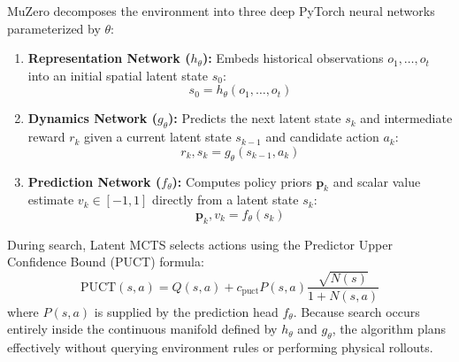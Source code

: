 \documentclass[12pt,a4paper]{article}
\begin{document}
MuZero decomposes the environment into three deep PyTorch neural networks parameterized by $\theta$:
\begin{enumerate}
    \item \textbf{Representation Network ($h_\theta$):} Embeds historical observations $o_1, \dots, o_t$ into an initial spatial latent state $s_0$:
    \begin{equation}
        s_0 = h_\theta(o_1, \dots, o_t)
    \end{equation}
    \item \textbf{Dynamics Network ($g_\theta$):} Predicts the next latent state $s_k$ and intermediate reward $r_k$ given a current latent state $s_{k-1}$ and candidate action $a_k$:
    \begin{equation}
        r_k, s_k = g_\theta(s_{k-1}, a_k)
    \end{equation}
    \item \textbf{Prediction Network ($f_\theta$):} Computes policy priors $\mathbf{p}_k$ and scalar value estimate $v_k \in [-1, 1]$ directly from a latent state $s_k$:
    \begin{equation}
        \mathbf{p}_k, v_k = f_\theta(s_k)
    \end{equation}
\end{enumerate}

During search, Latent MCTS selects actions using the Predictor Upper Confidence Bound (PUCT) formula:
\begin{equation}
    \text{PUCT}(s, a) = Q(s, a) + c_{\text{puct}} P(s, a) \frac{\sqrt{N(s)}}{1 + N(s, a)}
\end{equation}
where $P(s, a)$ is supplied by the prediction head $f_\theta$. Because search occurs entirely inside the continuous manifold defined by $h_\theta$ and $g_\theta$, the algorithm plans effectively without querying environment rules or performing physical rollouts.
\end{document}
